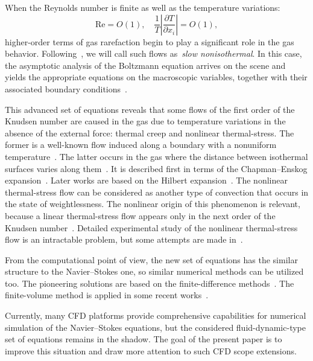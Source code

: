 \documentclass[smallextended, final]{svjour3} %
\newcommand{\pder}[2][]{\frac{\partial#1}{\partial#2}}
\begin{document}
When the Reynolds number is finite as well as the temperature variations:
\[ \mathrm{Re} = O(1), \quad \frac1T\left|\pder[T]{x_i}\right| = O(1), \]
higher-order terms of gas rarefaction begin to play a significant role in the gas behavior.
Following~\cite{Kogan1976}, we will call such flows as~\emph{slow nonisothermal}.
In this case, the asymptotic analysis of the Boltzmann equation arrives on the scene and
yields the appropriate equations on the macroscopic variables, together with
their associated boundary conditions~\cite{Sone2002, Sone2007}.

This advanced set of equations reveals that some flows of the first order of the Knudsen number
are caused in the gas due to temperature variations in the absence of the external force:
thermal creep and nonlinear thermal-stress. The former is a well-known flow induced along a boundary
with a nonuniform temperature~\cite{Maxwell1879Stresses, Ohwada1989Creep}.
The latter occurs in the gas where the distance between isothermal surfaces varies along them~\cite{Kogan1976}.
It is described first in terms of the Chapman--Enskog expansion~\cite{Kogan1971}.
Later works are based on the Hilbert expansion~\cite{SoneBobylev96}.
The nonlinear thermal-stress flow can be considered as another type of convection
that occurs in the state of weightlessness.
The nonlinear origin of this phenomenon is relevant, because a linear thermal-stress flow
appears only in the next order of the Knudsen number~\cite{Sone1972Stress}.
Detailed experimental study of the nonlinear thermal-stress flow is an intractable problem,
but some attempts are made in~\cite{ExperimentsNTFS2003}.

From the computational point of view, the new set of equations has the similar structure
to the Navier--Stokes one, so similar numerical methods can be utilized too.
The pioneering solutions are based on the finite-difference
methods~\cite{SoneBobylev96, Aleksandrov2002Tube, Aleksandrov2008Particle}.
The finite-volume method is applied in some recent works~\cite{Laneryd2006, Laneryd2007}.

Currently, many CFD platforms provide comprehensive
capabilities for numerical simulation of the Navier--Stokes equations,
but the considered fluid-dynamic-type set of equations remains in the shadow.
The goal of the present paper is to improve this situation and
draw more attention to such CFD scope extensions.
\end{document}
